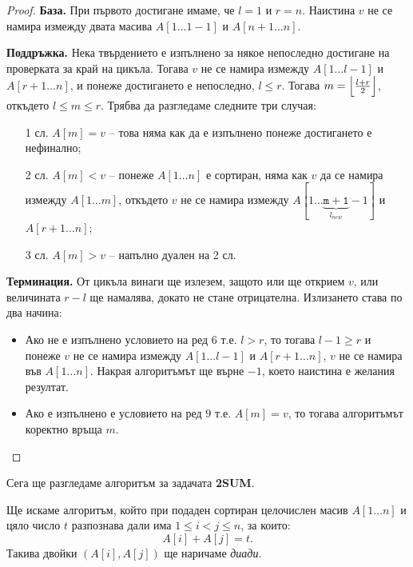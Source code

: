 \begin{proof}
    \phantom{1}

    \textbf{База.}
    При първото достигане имаме, че $l = 1$ и $r = n$.
    Наистина $v$ не се намира измежду двата масива $A[1 \dots 1 - 1]$ и $A[n + 1 \dots n]$.

    \textbf{Поддръжка.}
    Нека твърдението е изпълнено за някое непоследно достигане на проверката за край на цикъла.
    Тогава $v$ не се намира измежду $A[1 \dots l - 1]$ и $A[r + 1 \dots n]$, и понеже достигането е непоследно, $l \leq r$.
    Тогава $m = \Bigl\lfloor \frac{l + r}{2} \Bigr\rfloor$, откъдето ${l \leq m \leq r}$.
    Трябва да разгледаме следните три случая:
    \begin{itemize}
        \item[1 сл.] $A[m] = v$ -- това няма как да е изпълнено понеже достигането е нефинално;
        \item[2 сл.] $A[m] < v$ -- понеже $A[1 \dots n]$ е сортиран, няма как $v$ да се намира измежду $A[1 \dots m]$, откъдето $v$ не се намира измежду $A[1 \dots \underbrace{\mathtt{m + 1}}_{l_{new}} - 1]$ и $A[r + 1 \dots n]$;
        \item[3 сл.] $A[m] > v$ -- напълно дуален на 2 сл.
    \end{itemize}

    \textbf{Терминация.}
    От цикъла винаги ще излезем, защото или ще открием $v$, или величината $r - l$ ще намалява, докато не стане отрицателна.
    Излизането става по два начина:
    \begin{itemize}
        \item Ако не е изпълнено условието на ред $6$ т.е. $l > r$, то тогава $l - 1 \geq r$ и понеже $v$ не се намира измежду $A[1 \dots l - 1]$ и $A[r + 1 \dots n]$, $v$ не се намира във $A[1 \dots n]$.
              Накрая алгоритъмът ще върне $-1$, което наистина е желания резултат.
        \item Ако е изпълнено е условието на ред $9$ т.е. $A[m] = v$, то тогава алгоритъмът коректно връща $m$.
    \end{itemize}
\end{proof}

Сега ще разгледаме алгоритъм за задачата \textbf{2SUM}.

Ще искаме алгоритъм, който при подаден сортиран целочислен масив $A[1 \dots n]$ и цяло число $t$ разпознава дали има $1 \leq i < j \leq n$, за които:
\[
    A[i] + A[j] = t.
\]
Такива двойки $(A[i], A[j])$ ще наричаме \textit{диади}.


